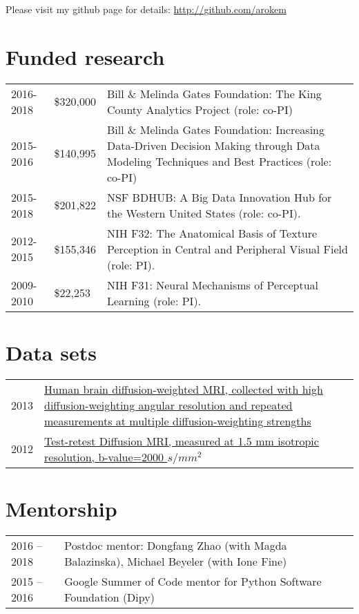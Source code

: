 \documentclass[11pt,fullpage]{article}
\begin{document}
Please visit my github page for details: \url{http://github.com/arokem}

\section*{Funded research}
\begin{tabular}{llp{12cm}}
  2016-2018 & \$320,000 & Bill \& Melinda Gates Foundation: The King County Analytics Project (role: co-PI) \\
  2015-2016 & \$140,995 & Bill \& Melinda Gates Foundation: Increasing Data-Driven Decision Making through Data Modeling Techniques and Best Practices (role: co-PI)\\
  2015-2018 & \$201,822 & NSF BDHUB: A Big Data Innovation Hub for the Western United States (role: co-PI).\\
  2012-2015 & \$155,346 & NIH F32: The Anatomical Basis of Texture Perception in Central and Peripheral Visual Field (role: PI). \\
  2009-2010 &  \$22,253 & NIH F31: Neural Mechanisms of Perceptual Learning (role: PI).\\
\end{tabular}

\section*{Data sets}
\begin{longtable}{p{0.3in}|p{5.5in}}

2013 & \href{https://purl.stanford.edu/ng782rw8378}{Human brain diffusion-weighted MRI, collected with high diffusion-weighting angular resolution and repeated measurements at multiple diffusion-weighting strengths} \\
2012 & \href{https://purl.stanford.edu/rt034xr8593}{Test-retest Diffusion MRI, measured at 1.5 mm isotropic resolution, b-value=2000 $s/mm^2$}\\

\end{longtable}


\section*{Mentorship}
\begin{longtable}{p{1.0in}|p{5.5in}}

2016 -- 2018 & Postdoc mentor: Dongfang Zhao (with Magda Balazinska), Michael Beyeler (with Ione Fine) \\

2015 -- 2016 & Google Summer of Code mentor for Python Software Foundation (Dipy)\\

\end{longtable}
\end{document}
